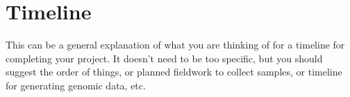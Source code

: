\section{Timeline}
This can be a general explanation of what you are thinking of for a timeline for completing your project. It doesn't need to be too specific, but you should suggest the order of things, or planned fieldwork to collect samples, or timeline for generating genomic data, etc.